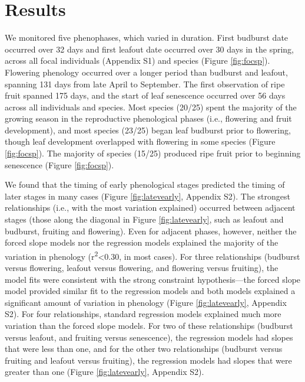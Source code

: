 \documentclass{article}
\begin{document}
\section* {Results}
\par We monitored five phenophases, which varied in duration. First budburst date occurred over 32 days and first leafout date occurred over 30 days in the spring, across all focal individuals (Appendix S1) and species (Figure \ref{fig:focsp}). Flowering phenology occurred over a longer period than budburst and leafout, spanning 131 days from late April to September. The first observation of ripe fruit spanned 175 days, and the start of leaf senescence occurred over 56 days across all individuals and species. Most species (20/25) spent the majority of the growing season in the reproductive phenological phases (i.e., flowering and fruit development), and most species (23/25) began leaf budburst prior to flowering, though leaf development overlapped with flowering in some species (Figure \ref{fig:focsp}). The majority of species (15/25) produced ripe fruit prior to beginning senescence (Figure \ref{fig:focsp}). 

\par We found that the timing of early phenological stages predicted the timing of later stages in many cases (Figure \ref{fig:latevearly}, Appendix S2). The strongest relationships (i.e., with the most variation explained) occurred between adjacent stages (those along the diagonal in Figure \ref{fig:latevearly}, such as leafout and budburst, fruiting and flowering). Even for adjacent phases, however, neither the forced slope models nor the regression models explained the majority of the variation in phenology (r\textsuperscript{2}<0.30, in most cases). For three relationships (budburst versus flowering, leafout versus flowering, and flowering versus fruiting), the model fits were consistent with the strong constraint hypothesis---the forced slope model provided similar fit to the regression models and both models explained a significant amount of variation in phenology (Figure \ref{fig:latevearly}, Appendix S2). For four relationships, standard regression models explained much more variation than the forced slope models. For two of these relationships (budburst versus leafout, and fruiting versus senescence), the regression models had slopes that were less than one, and for the other two relationships (budburst versus fruiting and leafout versus fruiting), the regression models had slopes that were greater than one (Figure \ref{fig:latevearly}, Appendix S2).
\end{document}
